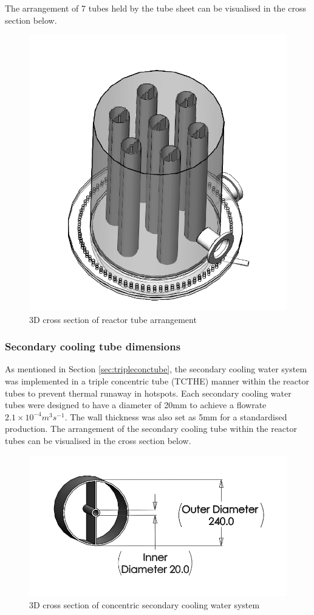 The arrangement of 7 tubes held by the tube sheet can be visualised in the cross section below.

\begin{figure}[H]
    \centering
    \includegraphics[width=0.4\linewidth]{chapters/2-reaction/figures/FYD reactor 7 tubes cross section 3D.PNG}
    \caption{3D cross section of reactor tube arrangement}
    \label{fig:reactortubearrangement}
\end{figure}

\subsubsection{Secondary cooling tube dimensions}
As mentioned in Section \ref{sec:tripleconctube}, the secondary cooling water system was implemented in a triple concentric tube (TCTHE) manner within the reactor tubes to prevent thermal runaway in hotspots. Each secondary cooling water tubes were designed to have a diameter of 20mm to achieve a flowrate $2.1 \times 10^{-4} m^3 s^{-1}$. The wall thickness was also set as 5mm for a standardised production. 
The arrangement of the secondary cooling tube within the reactor tubes can be visualised in the cross section below. 
\begin{figure}[H]
    \centering
    \includegraphics[width=0.8\linewidth]{chapters/2-reaction/figures/FYD conc tube with calc bw.png} 
    \caption{3D cross section of concentric secondary cooling water system}
    \label{fig:concentriccoolingwater}
\end{figure}

